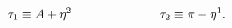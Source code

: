 \begin{equation}
 \tau_1 \equiv A+\eta^2 \hspace{2.5cm} \tau_2 \equiv \pi - \eta^1.
 \label{a47}
 \end{equation}

